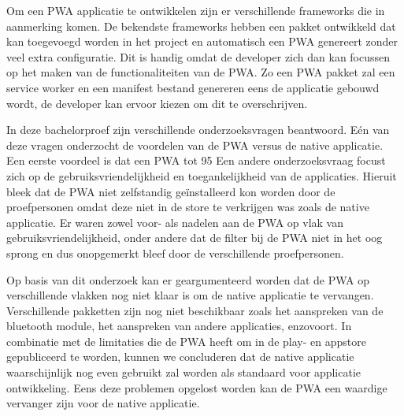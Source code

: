 Om een PWA applicatie te ontwikkelen zijn er verschillende frameworks die in aanmerking komen. De bekendste frameworks hebben een pakket ontwikkeld dat kan toegevoegd worden in het project en automatisch een PWA genereert zonder veel extra configuratie. Dit is handig omdat de developer zich dan kan focussen op het maken van de functionaliteiten van de PWA. Zo een PWA pakket zal een service worker en een manifest bestand genereren eens de applicatie gebouwd wordt, de developer kan ervoor kiezen om dit te overschrijven. 

In deze bachelorproef zijn verschillende onderzoeksvragen beantwoord. Eén van deze vragen onderzocht de voordelen van de PWA versus de native applicatie. Een eerste voordeel is dat een PWA tot 95 %
Een andere onderzoeksvraag focust zich op de gebruiksvriendelijkheid en toegankelijkheid van de applicaties. Hieruit bleek dat de PWA niet zelfstandig geïnstalleerd kon worden door de proefpersonen omdat deze niet in de store te verkrijgen was zoals de native applicatie. Er waren zowel voor- als nadelen aan de PWA op vlak van gebruiksvriendelijkheid, onder andere dat de filter bij de PWA niet in het oog sprong en dus onopgemerkt bleef door de verschillende proefpersonen. 

Op basis van dit onderzoek kan er geargumenteerd worden dat de PWA op verschillende vlakken nog niet klaar is om de native applicatie te vervangen. Verschillende pakketten zijn nog niet beschikbaar zoals het aanspreken van de bluetooth module, het aanspreken van andere applicaties, enzovoort. In combinatie met de limitaties die de PWA heeft om in de play- en appstore gepubliceerd te worden, kunnen we concluderen dat de native applicatie waarschijnlijk nog even gebruikt zal worden als standaard voor applicatie ontwikkeling. Eens deze problemen opgelost worden kan de PWA een waardige vervanger zijn voor de native applicatie.


